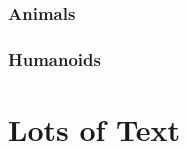 \documentclass[a4paper,openany]{book}
\begin{document}
\begin{multicols}{2}

\subsection{Animals}

\morphhorse

\morphcrab

\morphcat

\morphslug

\morphspider

\morphwolf

\subsection{Humanoids}

\goblin

\goblincaster

\hobgoblin

\ogre

\end{multicols}


\chapter{Lots of Text}

\begin{multicols}{2}

\noindent
\lipsum

\end{multicols}
\end{document}
